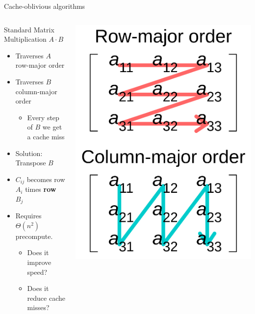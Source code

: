 \documentclass[compress,aspectratio=169]{beamer}
\begin{document}
\begin{frame}{Cache-oblivious algorithms \cite{frigo}}
  \begin{columns}
    \begin{column}{0.5\textwidth}
      Standard Matrix Multiplication $A \cdot B$
      \begin{itemize}
        \item Traverses $A$ row-major order
        \item Traverses $B$ column-major order
          \begin{itemize}
            \item Every step of $B$ we get a cache miss
          \end{itemize}
        \item Solution: Transpose $B$
        \item $C_{ij}$ becomes row $A_i$ times \textbf{row} $B_j$
        \item Requires $\Theta(n^2)$ precompute.
          \begin{itemize}
            \item Does it improve speed?
            \item Does it reduce cache misses?
          \end{itemize}
      \end{itemize}
    \end{column}
    \begin{column}{0.5\textwidth}
      \includegraphics[height=0.9\textheight]{./assets/Row_and_column_major_order.svg.png}

\end{column}
\end{columns}
\end{frame}
\end{document}
